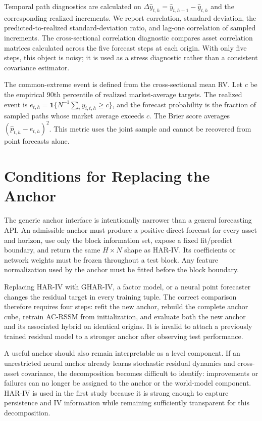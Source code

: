 \documentclass[11pt]{article}
\begin{document}
Temporal path diagnostics are calculated on $\Delta\widehat y_{t,h}=\widehat y_{t,h+1}-\widehat y_{t,h}$ and the corresponding realized increments. We report correlation, standard deviation, the predicted-to-realized standard-deviation ratio, and lag-one correlation of sampled increments. The cross-sectional correlation diagnostic compares asset correlation matrices calculated across the five forecast steps at each origin. With only five steps, this object is noisy; it is used as a stress diagnostic rather than a consistent covariance estimator.

The common-extreme event is defined from the cross-sectional mean RV. Let $c$ be the empirical 90th percentile of realized market-average targets. The realized event is $e_{t,h}=\mathbf1\{N^{-1}\sum_i y_{i,t,h}\geq c\}$, and the forecast probability is the fraction of sampled paths whose market average exceeds $c$. The Brier score averages $(\widehat p_{t,h}-e_{t,h})^2$. This metric uses the joint sample and cannot be recovered from point forecasts alone.

\section{Conditions for Replacing the Anchor}
The generic anchor interface is intentionally narrower than a general forecasting API. An admissible anchor must produce a positive direct forecast for every asset and horizon, use only the block information set, expose a fixed fit/predict boundary, and return the same $H\times N$ shape as HAR-IV. Its coefficients or network weights must be frozen throughout a test block. Any feature normalization used by the anchor must be fitted before the block boundary.

Replacing HAR-IV with GHAR-IV, a factor model, or a neural point forecaster changes the residual target in every training tuple. The correct comparison therefore requires four steps: refit the new anchor, rebuild the complete anchor cube, retrain AC-RSSM from initialization, and evaluate both the new anchor and its associated hybrid on identical origins. It is invalid to attach a previously trained residual model to a stronger anchor after observing test performance.

A useful anchor should also remain interpretable as a level component. If an unrestricted neural anchor already learns stochastic residual dynamics and cross-asset covariance, the decomposition becomes difficult to identify: improvements or failures can no longer be assigned to the anchor or the world-model component. HAR-IV is used in the first study because it is strong enough to capture persistence and IV information while remaining sufficiently transparent for this decomposition.
\end{document}
